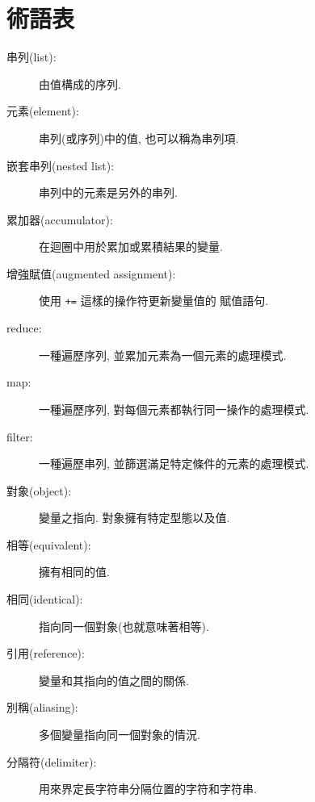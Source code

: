 \documentclass[10pt]{book}
\begin{document}
\section{術語表}

\begin{description}

\item[串列(list):] 由值構成的序列. 

\item[元素(element):] 串列(或序列)中的值, 也可以稱為串列項.

\item[嵌套串列(nested list):] 串列中的元素是另外的串列. 

\item[累加器(accumulator):] 在迴圈中用於累加或累積結果的變量.

\item[增強賦值(augmented assignment):] 使用 \verb"+=" 這樣的操作符更新變量值的
賦值語句.

\item[reduce:] 一種遍歷序列, 並累加元素為一個元素的處理模式.

\item[map:] 一種遍歷序列, 對每個元素都執行同一操作的處理模式.

\item[filter:] 一種遍歷串列, 並篩選滿足特定條件的元素的處理模式.

\item[對象(object):] 變量之指向. 對象擁有特定型態以及值.

\item[相等(equivalent):] 擁有相同的值.

\item[相同(identical):] 指向同一個對象(也就意味著相等).

\item[引用(reference):] 變量和其指向的值之間的關係.

\item[別稱(aliasing):] 多個變量指向同一個對象的情況.

\item[分隔符(delimiter):] 用來界定長字符串分隔位置的字符和字符串.

\end{description}
\end{document}
